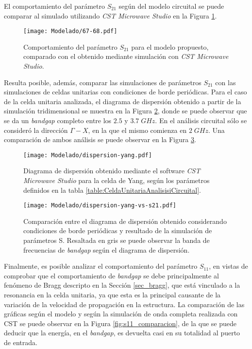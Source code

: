 El comportamiento del parámetro $S_{21}$ según del modelo circuital se puede comparar al simulado utilizando \textit{CST Microwave Studio} en la Figura \ref{fig:s12_modelo_final}.

\begin{figure}[h]
	\centering
	\texttt{[image: Modelado/67-68.pdf]}
	\caption{Comportamiento del parámetro $S_{21}$ para el modelo propuesto, comparado con el obtenido mediante simulación con \textit{CST Microwave Studio}.}
	\label{fig:s12_modelo_final}
\end{figure}

Resulta posible, además, comparar las simulaciones de parámetros $S_{21}$ con las simulaciones de celdas unitarias con condiciones de borde periódicas. Para el caso de la celda unitaria analizada, el diagrama de dispersión obtenido a partir de la simulación tridimensional se muestra en la Figura \ref{fig:diag-disp-yang-cst}, donde se puede observar que se da un \textit{bandgap} completo entre los $2.5$ y $3.7\;GHz$. En el análisis circuital sólo se consideró la dirección $\Gamma-X$, en la que el mismo comienza en $2\; GHz$. Una comparación de ambos análisis se puede observar en la Figura \ref{fig:diag-disp-yang-vs-s21}.

\begin{figure}[h]
	\centering
	\texttt{[image: Modelado/dispersion-yang.pdf]}
	\caption{Diagrama de dispersión obtenido mediante el software \textit{CST Microwave Studio} para la celda de Yang, según los parámetros definidos en la tabla \ref{table:CeldaUnitariaAnalisisiCircuital}.}
	\label{fig:diag-disp-yang-cst}
\end{figure}

\begin{figure}[h]
	\centering
	\texttt{[image: Modelado/dispersion-yang-vs-s21.pdf]}
	\caption{Comparación entre el diagrama de dispersión obtenido considerando condiciones de borde periódicas y resultado de la simulación de parámetros S. Resaltada en gris se puede observar la banda de frecuencias de \textit{bandgap} según el diagrama de dispersión.}
	\label{fig:diag-disp-yang-vs-s21}
\end{figure}

Finalmente, es posible analizar el comportamiento del parámetro $S_{11}$, en vistas de comprobar que el comportamiento de \textit{bandgap} se debe principalmente al fenómeno de Bragg descripto en la Sección \ref{sec_bragg}, que está vinculado a la resonancia en la celda unitaria, ya que esta es la principal causante de la variación de la velocidad de propagación en la estructura. La comparación de las gráficas según el modelo y según la simulación de onda completa realizada con CST se puede observar en la Figura \ref{fig:s11_comparacion}, de la que se puede deducir que la energía, en el \textit{bandgap}, es devuelta casi en su totalidad al puerto de entrada.

